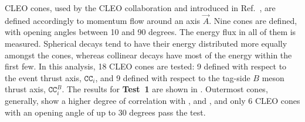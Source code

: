CLEO cones, used by the CLEO collaboration and introduced in Ref.~\cite{CLEO:1995rok}, are defined accordingly to momentum flow around an axis $\vec{A}$.
Nine cones are defined, with opening angles between 10 and 90 degrees. 
The energy flux in all of them is measured.
Spherical decays tend to have their energy distributed more equally amongst the cones, whereas collinear decays have most of the energy within the first few.
In this analysis, 18 CLEO cones are tested: 9 defined with respect to the event thrust axis, $\mathtt{CC}_{i}$, and 9 defined with respect to the tag-side $B$ meson thrust axis, $\mathtt{CC}^B_{i}$.
The results for \textbf{Test~1} are shown in .
Outermost cones, generally, show a higher degree of correlation with \EB, \Estar and \Mbc, and only 6 CLEO cones with an opening angle of up to 30 degrees pass the test.

